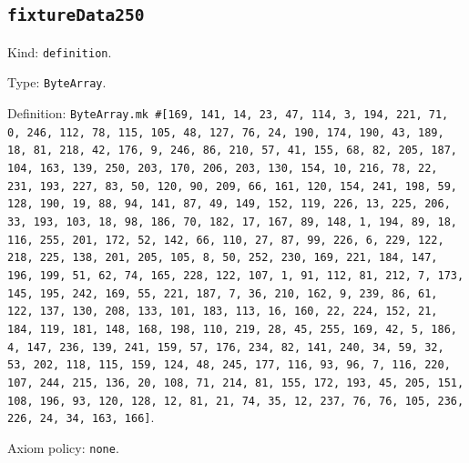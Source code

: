 \documentclass[11pt]{article}
\begin{document}
\subsection*{\texttt{fixtureData250}}
\noindent Kind: \texttt{definition}.\par
\noindent Type: \texttt{ByteArray}.\par
\noindent Definition: \texttt{ByteArray.mk \#[169, 141, 14, 23, 47, 114, 3, 194, 221, 71, 0, 246, 112, 78, 115, 105, 48, 127, 76, 24, 190, 174, 190, 43, 189, 18, 81, 218, 42, 176, 9, 246, 86, 210, 57, 41, 155, 68, 82, 205, 187, 104, 163, 139, 250, 203, 170, 206, 203, 130, 154, 10, 216, 78, 22, 231, 193, 227, 83, 50, 120, 90, 209, 66, 161, 120, 154, 241, 198, 59, 128, 190, 19, 88, 94, 141, 87, 49, 149, 152, 119, 226, 13, 225, 206, 33, 193, 103, 18, 98, 186, 70, 182, 17, 167, 89, 148, 1, 194, 89, 18, 116, 255, 201, 172, 52, 142, 66, 110, 27, 87, 99, 226, 6, 229, 122, 218, 225, 138, 201, 205, 105, 8, 50, 252, 230, 169, 221, 184, 147, 196, 199, 51, 62, 74, 165, 228, 122, 107, 1, 91, 112, 81, 212, 7, 173, 145, 195, 242, 169, 55, 221, 187, 7, 36, 210, 162, 9, 239, 86, 61, 122, 137, 130, 208, 133, 101, 183, 113, 16, 160, 22, 224, 152, 21, 184, 119, 181, 148, 168, 198, 110, 219, 28, 45, 255, 169, 42, 5, 186, 4, 147, 236, 139, 241, 159, 57, 176, 234, 82, 141, 240, 34, 59, 32, 53, 202, 118, 115, 159, 124, 48, 245, 177, 116, 93, 96, 7, 116, 220, 107, 244, 215, 136, 20, 108, 71, 214, 81, 155, 172, 193, 45, 205, 151, 108, 196, 93, 120, 128, 12, 81, 21, 74, 35, 12, 237, 76, 76, 105, 236, 226, 24, 34, 163, 166]}.\par
\noindent Axiom policy: \texttt{none}.\par
\end{document}
